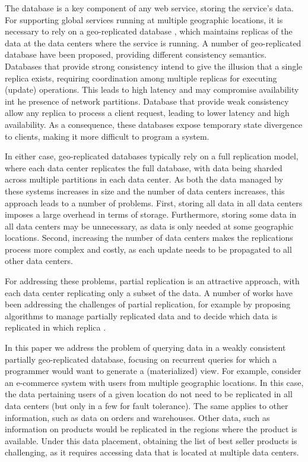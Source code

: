 \documentclass{vldb}
\begin{document}

The database is a key component of any web service, storing the service's data. For supporting global
services running at multiple geographic locations, it is necessary to rely on a geo-replicated database \cite{dynamo},
which maintains replicas of the data at the data centers where the service is running.
A number of geo-replicated database have been proposed, providing different consistency semantics.
Databases that provide strong consistency \cite{spanner,cockroachdb,mdcc} intend to give  the illusion that 
a single replica exists, requiring coordination among
multiple replicas for executing (update) operations. This leads to high latency and may compromise 
availability int he presence of network partitions.
Database that provide weak consistency \cite{eventual,dynamo,cops} allow any replica to process a
client request, leading to lower latency and high availability. As a consequence, these databases expose
temporary state divergence to clients, making it more difficult to program a system. 

In either case, geo-replicated databases typically rely on a full replication model, where each data 
center replicates the full database, with data being sharded across multiple partitions in each data 
center. 
As both the data managed by these systems increases in size and the number of data centers increases,
this approach leads to a number of problems.
First, storing all data in all data centers imposes a large overhead in terms of storage. 
Furthermore, storing some data in all data centers may be unnecessary, as data is only needed at some
geographic locations.
Second, increasing the number of data centers makes the replications process more complex and costly, 
as each update needs to be propagated to all other data centers.

For addressing these problems, partial replication is an attractive approach, with each data center
replicating only a subset of the data. A number of works have been addressing the challenges of 
partial replication, for example by proposing algorithms to manage partially replicated data \cite{more,saturn,c3}
and to decide which data is replicated in which replica \cite{}.

In this paper we address the problem of querying data in a weakly consistent partially geo-replicated database, 
focusing on recurrent queries for which a programmer would want to generate a (materialized) view.
For example, consider an e-commerce system with users from multiple geographic locations.
In this case, the data pertaining users of a given location do not need to be replicated in all data centers
(but only in a few for fault tolerance). The same applies to other information, such as data on orders and 
warehouses.
Other data, such as information on products would be replicated in the regions where the product
is available.  
Under this data placement, obtaining the list of best seller products is challenging, as it requires
accessing data that is located at multiple data centers.
\end{document}
